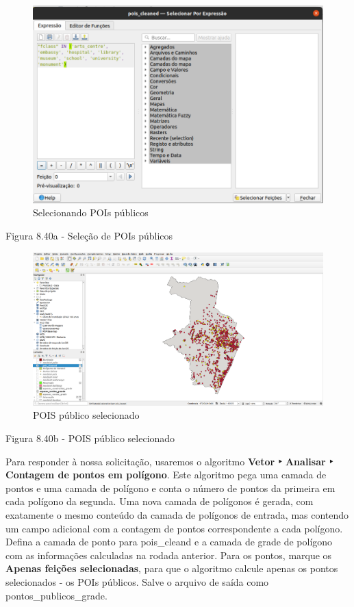 \documentclass[
]{book}
\begin{document}
\begin{figure}
\centering
\includegraphics{media/modulo8/fig840_a.png}
\caption{Selecionando POIs públicos}
\end{figure}

Figura 8.40a - Seleção de POIs públicos

\begin{figure}
\centering
\includegraphics{media/modulo8/fig840_b.png}
\caption{POIS público selecionado}
\end{figure}

Figura 8.40b - POIS público selecionado

Para responder à nossa solicitação, usaremos o algoritmo \textbf{Vetor ‣ Analisar ‣ Contagem de pontos em polígono}. Este algoritmo pega uma camada de pontos e uma camada de polígono e conta o número de pontos da primeira em cada polígono da segunda. Uma nova camada de polígonos é gerada, com exatamente o mesmo conteúdo da camada de polígonos de entrada, mas contendo um campo adicional com a contagem de pontos correspondente a cada polígono. Defina a camada de ponto para pois\_cleand e a camada de grade de polígono com as informações calculadas na rodada anterior. Para os pontos, marque os \textbf{Apenas feições selecionadas}, para que o algoritmo calcule apenas os pontos selecionados - os POIs públicos. Salve o arquivo de saída como pontos\_publicos\_grade.
\end{document}
